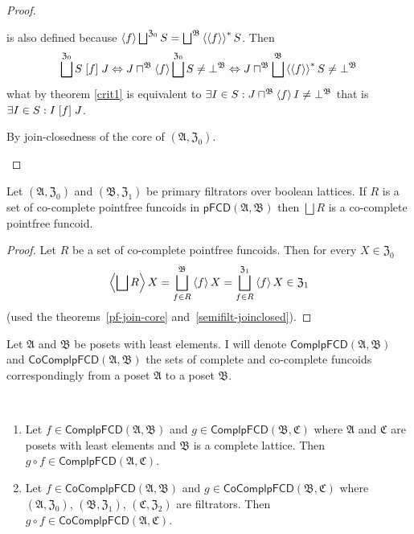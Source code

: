 \begin{proof}
\begin{description}
is also defined because $\supfun f\bigsqcup^{\mathfrak{Z}_{0}}S=\bigsqcup^{\mathfrak{B}}\rsupfun{\supfun f}S$.
Then
\[
\bigsqcup^{\mathfrak{Z}_{0}}S\suprel fJ\Leftrightarrow J\sqcap^{\mathfrak{B}}\supfun f\bigsqcup^{\mathfrak{Z}_{0}}S\neq\bot^{\mathfrak{B}}\Leftrightarrow J\sqcap^{\mathfrak{B}}\bigsqcup^{\mathfrak{B}}\rsupfun{\supfun f}S\neq\bot^{\mathfrak{B}}
\]
what by theorem \ref{crit1} is equivalent to $\exists I\in S:J\sqcap^{\mathfrak{B}}\left\langle f\right\rangle I\neq\bot^{\mathfrak{B}}$
that is $\exists I\in S:I\mathrel{\left[f\right]}J$.
\item [{\ref{pf-ax:fcd-full-fa-filt}$\Rightarrow$\ref{pf-ax:fcd-full-fa-set},~\ref{pf-ax:fcd-full-eq-filt}$\Rightarrow$\ref{pf-ax:fcd-full-eq-set}}] By
join-closedness of the core of $(\mathfrak{A},\mathfrak{Z}_{0})$.
\end{description}
\end{proof}
\begin{thm}
\label{pf-join-cocompl}Let $(\mathfrak{A},\mathfrak{Z}_{0})$ and
$(\mathfrak{B},\mathfrak{Z}_{1})$ be primary filtrators over boolean
lattices. If $R$ is a set of co-complete pointfree funcoids in $\mathsf{pFCD}(\mathfrak{A},\mathfrak{B})$
then $\bigsqcup R$ is a co-complete pointfree funcoid.\end{thm}
\begin{proof}
Let $R$ be a set of co-complete pointfree funcoids. Then for every
$X\in\mathfrak{Z}_{0}$
\[
\supfun{\bigsqcup R}X=\bigsqcup_{f\in R}^{\mathfrak{B}}\supfun fX=\bigsqcup_{f\in R}^{\mathfrak{Z}_{1}}\supfun fX\in\mathfrak{Z}_{1}
\]
(used the theorems~\ref{pf-join-core} and~\ref{semifilt-joinclosed}).
\end{proof}
Let $\mathfrak{A}$ and $\mathfrak{B}$ be posets with least elements.
I will denote $\mathsf{ComplpFCD}(\mathfrak{A},\mathfrak{B})$ and
$\mathsf{CoComplpFCD}(\mathfrak{A},\mathfrak{B})$ the sets of complete
and co-complete funcoids correspondingly from a poset $\mathfrak{A}$
to a poset $\mathfrak{B}$.
\begin{prop}
~
\begin{enumerate}
\item \label{pf-compl-comp}Let $f\in\mathsf{ComplpFCD}(\mathfrak{A},\mathfrak{B})$
and $g\in\mathsf{ComplpFCD}(\mathfrak{B},\mathfrak{C})$ where $\mathfrak{A}$
and $\mathfrak{C}$ are posets with least elements and $\mathfrak{B}$
is a complete lattice. Then $g\circ f\in\mathsf{ComplpFCD}(\mathfrak{A},\mathfrak{C})$.
\item \label{pf-cocompl-comp}Let $f\in\mathsf{CoComplpFCD}(\mathfrak{A},\mathfrak{B})$
and $g\in\mathsf{CoComplpFCD}(\mathfrak{B},\mathfrak{C})$ where 
$(\mathfrak{A},\mathfrak{Z}_{0})$, $(\mathfrak{B},\mathfrak{Z}_{1})$,
$(\mathfrak{C},\mathfrak{Z}_{2})$ are filtrators. Then $g\circ f\in\mathsf{CoComplpFCD}(\mathfrak{A},\mathfrak{C})$.
\end{enumerate}
\end{prop}

